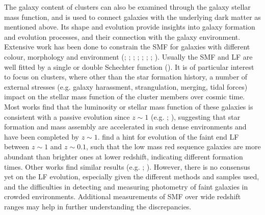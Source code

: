 {The galaxy content of clusters can also be examined through the galaxy stellar mass function, and is used to connect galaxies with the underlying dark matter as mentioned above. Its shape and evolution provide insights into galaxy formation and evolution processes, and their connection with the galaxy environment. Extensive work has been done to constrain the SMF for galaxies with different colour, morphology and environment (\citealt{bundy}; \citealt{baldry}; \citealt{pozzetti}; \citealt{vulcani12}; \citealt{mortlock}; \citealt{weigel}; \citealt{etherington}; \citealt{capozzi}). Usually the SMF and LF are well fitted by a single or double Schechter function (\citealt{Schechter}). It is of particular interest to focus on clusters, where other than the star formation history, a number of external stresses (e.g. galaxy harassment, strangulation, merging, tidal forces) impact on the stellar mass function of the cluster members over cosmic time. Most works find that the luminosity or stellar mass function of these galaxies is consistent with a passive evolution since $z\sim 1$ (e.g. \citealt{kodama}; \citealt{andreonlf}), suggesting that star formation and mass assembly are accelerated in such dense environments and have been completed by $z\sim 1$. \citet{zhangLF} find a hint for evolution of the faint end LF between $z\sim 1$ and $z\sim 0.1$, such that the low mass red sequence galaxies are more abundant than brighter ones at lower redshift, indicating different formation times. Other works find similar results (e.g. \citealt{delucialf}; \citealt{hsclf}). However, there is no consensus yet on the LF evolution, especially given the different methods and samples used, and the difficulties in detecting and measuring photometry of faint galaxies in crowded environments. Additional measurements of SMF over wide redshift ranges may help in further understanding the discrepancies.

}
